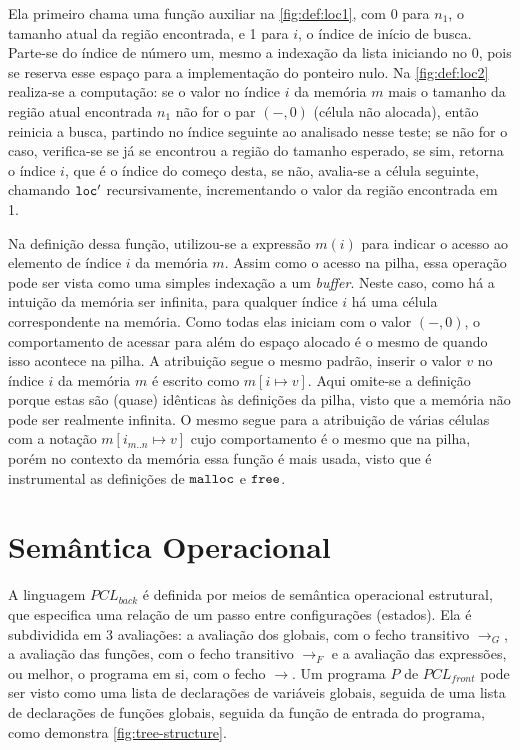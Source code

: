 \noindent Ela primeiro chama uma função auxiliar na \autoref{fig:def:loc1}, com 0 para $n_1$, o tamanho atual da região encontrada,  e 1 para $i$, o índice de início de busca. Parte-se do índice de número um, mesmo a indexação da lista iniciando no 0, pois se reserva esse espaço para a implementação do ponteiro nulo. Na \autoref{fig:def:loc2} realiza-se a computação: se o valor no índice $i$ da memória $m$ mais o tamanho da região atual encontrada $n_1$ não for o par $(-,0)$ (célula não alocada), então reinicia a busca, partindo no índice seguinte ao analisado nesse teste; se não for o caso, verifica-se se já se encontrou a região do tamanho esperado, se sim, retorna o índice $i$, que é o índice do começo desta, se não, avalia-se a célula seguinte, chamando $\texttt{loc}'$ recursivamente, incrementando o valor da região encontrada em 1.

Na definição dessa função, utilizou-se a expressão $m(i)$ para indicar o acesso ao elemento de índice $i$ da memória $m$. Assim como o acesso na pilha, essa operação pode ser vista como uma simples indexação a um \emph{buffer}. Neste caso, como há a intuição da memória ser infinita, para qualquer índice $i$ há uma célula correspondente na memória. Como todas elas iniciam com o valor $(-,0)$, o comportamento de acessar para além do espaço alocado é o mesmo de quando isso acontece na pilha. A atribuição segue o mesmo padrão, inserir o valor $v$ no índice $i$ da memória $m$ é escrito como $m[i \mapsto v]$. Aqui omite-se a definição porque estas são (quase) idênticas às definições da pilha, visto que a memória não pode ser realmente infinita. O mesmo segue para a atribuição de várias células com a notação $m[i_{m..n} \mapsto v]$ cujo comportamento é o mesmo que na pilha, porém no contexto da memória essa função é mais usada, visto que é  instrumental as definições de $\texttt{malloc}$ e $\texttt{free}$.


\section{Semântica Operacional}
\label{sec:pcl-back:semantica}

A linguagem $PCL_{back}$ é definida por meios de semântica operacional estrutural, que especifica uma relação de um passo entre configurações (estados). Ela é subdividida em 3 avaliações: a avaliação dos globais, com o fecho transitivo $\to_G$, a avaliação das funções, com o fecho transitivo $\to_F$ e a avaliação das expressões, ou melhor, o programa em si, com o fecho $\to$. Um programa $P$ de $PCL_{front}$ pode ser visto como uma lista de declarações de variáveis globais, seguida de uma lista de declarações de funções globais, seguida da função de entrada do programa, como demonstra \ref{fig:tree-structure}.

